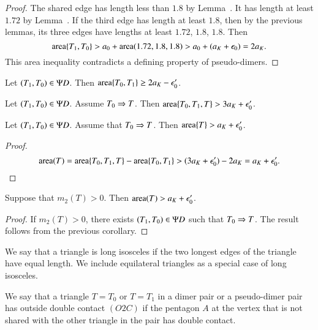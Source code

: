 \begin{proof}
The shared edge has length less than $1.8$ by Lemma~.  
It has length at least $1.72$ by Lemma~.
If the third edge has length at
least $1.8$, then by the previous lemmas, its three edges have lengths at least $1.72$, $1.8$, $1.8$.
Then 
\[
{\operatorname{area}}\{T_1,T_0\} > a_0 + {\operatorname{area}}(1.72,1.8,1.8) > a_0 + (a_K + \epsilon_0) = 2a_K.
\]
This area inequality contradicts a defining property of pseudo-dimers.
\end{proof}

\begin{lemma}
Let $(T_1,T_0)\in\Psi D$.  Then ${\operatorname{area}}\{T_0,T_1\} \ge 2a_K - \epsilon_0'$.
\end{lemma}

\begin{lemma}
Let $(T_1,T_0)\in\Psi D$. Assume $T_0\Rightarrow T$.  Then ${\operatorname{area}}\{T_0,T_1,T\} > 3a_K + \epsilon_0'$.
\end{lemma}

\begin{corollary} 
Let $(T_1,T_0)\in\Psi D$.  Assume that $T_0\Rightarrow T$.  Then
${\operatorname{area}}\{T\} > a_K+\epsilon_0'$.
\end{corollary}

\begin{proof}  
\[
{\operatorname{area}}(T) = {\operatorname{area}}\{T_0,T_1,T\} - {\operatorname{area}}\{T_0,T_1\} > (3a_K + \epsilon_0') - 2a_K = a_K + \epsilon_0'.
\]
\end{proof}

\begin{corollary}
Suppose that $m_2(T)>0$.  Then ${\operatorname{area}}(T) > a_K + \epsilon_0'$.
\end{corollary}

\begin{proof} If $m_2(T)>0$, there exists $(T_1,T_0)\in\Psi D$ such that $T_0\Rightarrow T$.
The result follows from the previous corollary.
\end{proof}


\begin{definition}
We say that a triangle is long isosceles if the two longest edges of the triangle have
equal length.  We include equilateral triangles as a special case of long isosceles.
\end{definition}

\begin{definition}[O2C]
We say that a triangle $T=T_0$ or $T=T_1$ in a dimer pair or a pseudo-dimer pair has outside double
contact $(O2C)$ if the pentagon $A$ at the vertex that is not shared with the other triangle in the pair
has double contact.
\end{definition}

